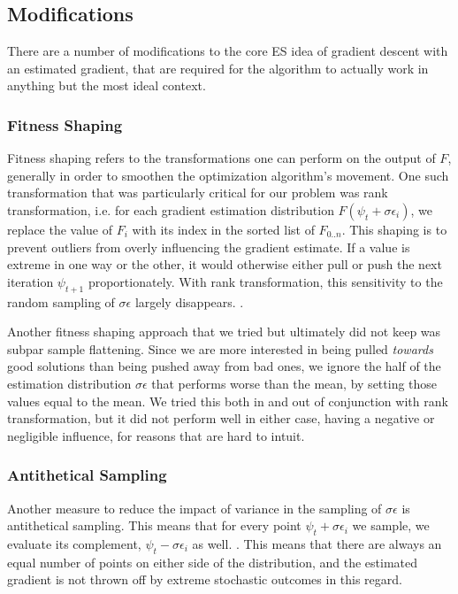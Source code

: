 \subsection{Modifications}
There are a number of modifications to the core ES idea of gradient descent with an estimated gradient, that are required for the algorithm to actually work in anything but the most ideal context. 

\subsubsection{Fitness Shaping}
Fitness shaping refers to the transformations one can perform on the output of $F$, generally in order to smoothen the optimization algorithm's movement. One such transformation that was particularly critical for our problem was rank transformation, i.e. for each gradient estimation distribution $F(\psi_t + \sigma\epsilon_i)$, we replace the value of $F_i$ with its index in the sorted list of $F_{0..n}$. This shaping is to prevent outliers from overly influencing the gradient estimate. If a value is extreme in one way or the other, it would otherwise either pull or push the next iteration $\psi_{t+1}$ proportionately. With rank transformation, this sensitivity to the random sampling of $\sigma\epsilon$ largely disappears. \cite{Wierstra2011}. 

Another fitness shaping approach that we tried but ultimately did not keep was subpar sample flattening. Since we are more interested in being pulled \textit{towards} good solutions than being pushed away from bad ones, we ignore the half of the estimation distribution $\sigma\epsilon$ that performs worse than the mean, by setting those values equal to the mean. We tried this both in and out of conjunction with rank transformation, but it did not perform well in either case, having a negative or negligible influence, for reasons that are hard to intuit.

\subsubsection{Antithetical Sampling}
Another measure to reduce the impact of variance in the sampling of $\sigma\epsilon$ is antithetical sampling. This means that for every point $\psi_t + \sigma\epsilon_i$ we sample, we evaluate its complement, $\psi_t - \sigma\epsilon_i$ as well. \cite{Salimans2017}. This means that there are always an equal number of points on either side of the distribution, and the estimated gradient is not thrown off by extreme stochastic outcomes in this regard.


